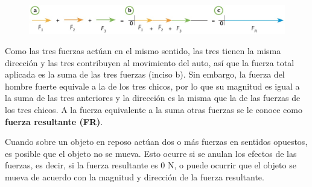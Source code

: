 \documentclass[11pt]{book}
\begin{document}
\begin{figure}[H]
  \centering
  \includegraphics[width=0.9\linewidth]{suma_fuerzas.jpg}
  \label{fig:suma_fuerzas}
\end{figure}


Como las tres fuerzas actúan en el mismo sentido, las tres tienen la misma dirección y
las tres contribuyen al movimiento del auto, así que la fuerza total aplicada es la suma
de las tres fuerzas (inciso b). Sin embargo, la fuerza del hombre fuerte equivale a la de
los tres chicos, por lo que su magnitud es igual a la suma de las tres anteriores y la
dirección es la misma que la de las fuerzas de los tres chicos. A la fuerza equivalente
a la suma otras fuerzas se le conoce como \textbf{fuerza resultante (FR)}.

Cuando sobre un objeto en reposo actúan dos o más fuerzas en sentidos opuestos,
es posible que el objeto no se mueva. Esto ocurre si se anulan los efectos de las
fuerzas, es decir, si la fuerza resultante es 0 N, o puede ocurrir que el objeto
se mueva de acuerdo con la magnitud y dirección de la fuerza resultante.
\end{document}
